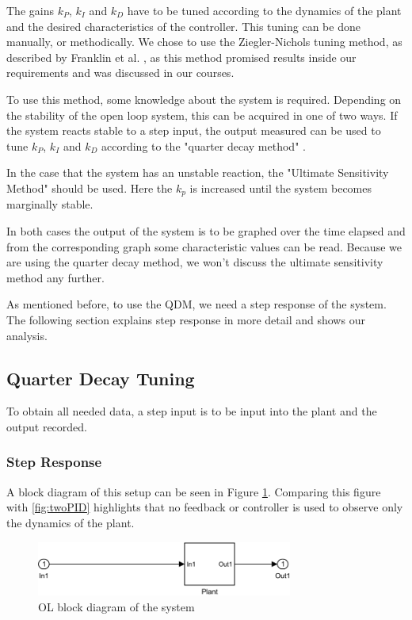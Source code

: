 The gains $k_P$, $k_I$ and $k_D$ have to be tuned according to the dynamics of the plant
and the desired characteristics of the controller.
This tuning can be done manually,
or methodically.
We chose to use the Ziegler-Nichols tuning method,
as described by Franklin et al. \cite{Franklin2014},
as this method promised results inside our requirements and was discussed in our courses.

To use this method, some knowledge about the system is required.
Depending on the stability of the open loop system,
this can be acquired in one of two ways.
If the system reacts stable to a step input,
the output measured can be used to tune $k_P$, $k_I$ and $k_D$ according to the "quarter decay method"
\cite{Franklin2014}.

In the case that the system has an unstable reaction,
the "Ultimate Sensitivity Method" should be used.
Here the $k_p$ is increased until the system becomes marginally stable.

In both cases the output of the system is to be graphed over the time elapsed
and from the corresponding graph some characteristic values can be read.
Because we are using the quarter decay method,
we won't discuss the ultimate sensitivity method any further.

As mentioned before,
to use the QDM, we need a step response of the system.
The following section explains step response in more detail and shows our analysis.

\subsection{Quarter Decay Tuning}\label{sub:quadec}
To obtain all needed data,
a step input is to be input into the plant
and the output recorded.
\subsubsection{Step Response}
A block diagram of this setup can be seen in Figure \ref{fig:OL}.
Comparing this figure with \ref{fig:twoPID} highlights
that no feedback or controller is used to observe only the dynamics of the plant.

\begin{figure}[H]
    \centering
    \includegraphics[width=0.75\textwidth]{figures/07controllerDesign/OLblock.pdf}
    \caption{OL block diagram of the system}
\label{fig:OL}
\end{figure}


